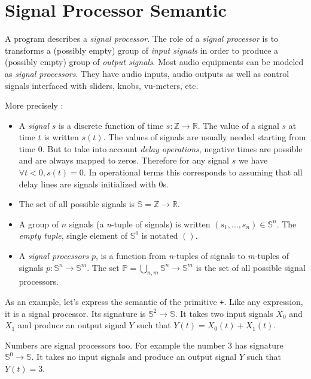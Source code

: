 \section{Signal Processor Semantic}
A \faust program describes a \emph{signal processor}. 
The role of a \textit{signal processor} is to transforms a (possibly empty) group  of \emph{input signals} in order to produce a (possibly empty) group of \emph{output signals}. 
Most audio equipments can be modeled as \emph{signal processors}. 
They have audio inputs, audio outputs as well as control signals interfaced with sliders, knobs, vu-meters, etc. 

More precisely :

\begin{itemize}

\item A \emph{signal} $s$ is a discrete function of time $s:\mathbb{Z}\rightarrow\mathbb{R}$.
The value of a signal $s$ at time $t$ is written $s(t)$. The values of signals are usually needed starting from time $0$. But to take into account \emph{delay operations}, negative times are possible and are always mapped to zeros. Therefore for any \faust signal $s$ we have $\forall t<0, s(t)=0$. In operational terms this corresponds to assuming that all delay lines are signals initialized with $0$s.
 
\item The set of all possible  signals is $\mathbb{S}=\mathbb{Z}\rightarrow\mathbb{R}$.

\item A group of $n$ signals (a \emph{n}-tuple of signals) is written
$(s_{1},\ldots,s_{n})\in \mathbb{S}^{n}$.
The \emph{empty tuple}, single element of $\mathbb{S}^{0}$ is notated  $()$.

\item A \emph{signal processors} $p$, is a function from
\emph{n}-tuples of signals to \emph{m}-tuples of signals
$p:\mathbb{S}^{n}\rightarrow\mathbb{S}^{m}$. The set $\mathbb{P}=\bigcup_{n,m}\mathbb{S}^{n}\rightarrow\mathbb{S}^{m}$ is the
set of all possible signal processors.

\end{itemize}

As an example, let's express the semantic of the \faust primitive \lstinline'+'. Like any \faust expression, it is a signal processor. Its signature is $\mathbb{S}^{2}\rightarrow\mathbb{S}$. It takes two input signals $X_0$ and $X_1$ and produce an output signal $Y$ such that $Y(t) = X_0(t)+X_1(t)$. 

Numbers are signal processors too. For example the number $3$ has signature  $\mathbb{S}^{0}\rightarrow\mathbb{S}$.  It takes no input signals and produce an output signal $Y$ such that $Y(t) = 3$. 


